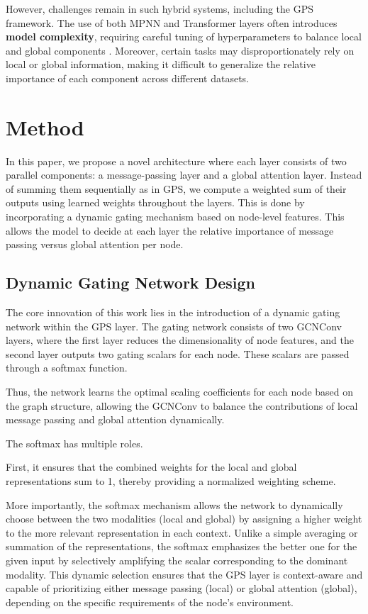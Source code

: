 \documentclass{acmart}
\begin{document}
However, challenges remain in such hybrid systems, including the GPS framework. The use of both MPNN and Transformer layers often introduces \textbf{model complexity}, requiring careful tuning of hyperparameters to balance local and global components \cite{rampášek2023recipegeneralpowerfulscalable}. Moreover, certain tasks may disproportionately rely on local or global information, making it difficult to generalize the relative importance of each component across different datasets.

\section{Method}

In this paper, we propose a novel architecture where each layer consists of two parallel components: a message-passing layer and a global attention layer. Instead of summing them sequentially as in GPS, we compute a weighted sum of their outputs using learned weights throughout the layers. This is done by incorporating a dynamic gating mechanism based on node-level features. This allows the model to decide at each layer the relative importance of message passing versus global attention per node.

\subsection{Dynamic Gating Network Design}

The core innovation of this work lies in the introduction of a dynamic gating network within the GPS layer. The gating network consists of two GCNConv layers, where the first layer reduces the dimensionality of node features, and the second layer outputs two gating scalars for each node. These scalars are passed through a softmax function.

Thus, the network learns the optimal scaling coefficients for each node based on the graph structure, allowing the GCNConv to balance the contributions of local message passing and global attention dynamically.

The softmax has multiple roles. 

First, it ensures that the combined weights for the local and global representations sum to 1, thereby providing a normalized weighting scheme. 

More importantly, the softmax mechanism allows the network to dynamically choose between the two modalities (local and global) by assigning a higher weight to the more relevant representation in each context. Unlike a simple averaging or summation of the representations, the softmax emphasizes the better one for the given input by selectively amplifying the scalar corresponding to the dominant modality. This dynamic selection ensures that the GPS layer is context-aware and capable of prioritizing either message passing (local) or global attention (global), depending on the specific requirements of the node’s environment.
\end{document}
